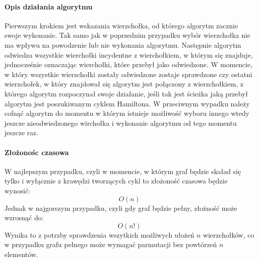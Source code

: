 \documentclass[]{article}
\begin{document}
		\paragraph{Opis działania algorytmu}
		Pierwszym krokiem jest wskazania wierzchołka, od którego algorytm zacznie swoje wykonanie. Tak samo jak w poprzednim przypadku wybór wierzchołka nie ma wpływu na powodzenie lub nie wykonania algorytmu. Następnie algorytm odwiedza wszystkie wierchołki incydentne z wierchołkiem, w którym się znajduje, jednocześnie oznaczając wierchołki, które przebył jako odwiedzone. W momencie, w który wszystkie wierzchołki zostały odwiedzone zostaje sprawdzone czy ostatni wierzchołek, w który znajdował się algorytm jest połączony z wierzchołkiem, z którego algorytm rozpoczynał swoje działanie, jeśli tak jest ścieżka jaką przebył algorytm jest poszukiwanym cyklem Hamiltona. W przeciwnym wypadku należy cofnąć algorytm do momentu w którym istnieje możliwość wyboru innego wtedy jeszcze nieodwiedzonego wirchołka i wykonanie algorytmu od tego momentu jeszcze raz.
		
		\paragraph{Złożonośc czasowa}
		W najlepszym przypadku, czyli  w momencie, w którym graf będzie skaład się tylko i wyłącznie z krawędzi tworzących cykl to złożoność czasowa będzie wynosić:
			\begin{equation}
				O(n)
			\end{equation}
		Jednak w najgorszym przypadku, czyli gdy graf będzie pełny, złożność może wzrosnąć do:
			\begin{equation}
				O(n!)
			\end{equation}
		Wynika to z potrzby sprawdzenia wszytkich możliwych ułożeń $n$ wierzchołków, co w przypadku grafu pełnego może wymagać parmutacji bez powtórzeń $n$ elementów.
			

\clearpage
\glsaddall
\printglossaries
\end{document}
